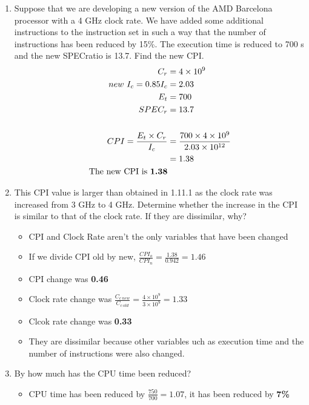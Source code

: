 \documentclass[10pt]{article}
\begin{document}
\begin{enumerate}
\begin{enumerate}
        \item
        Suppose that we are developing a new version of the AMD Barcelona processor with a 4 GHz clock rate. We have added some additional instructions to the instruction set in such a way that the number of instructions has been reduced by 15\%. The execution time is reduced to 700 s and the new SPECratio is 13.7. Find the new CPI.
        \begin{align*}
            C_r &= 4 \times 10^9\\
            new\ I_c = 0.85I_c &= 2.03\\
            E_t &= 700\\
            SPEC_r &= 13.7\\\\
            CPI = \frac{E_t \times C_r}{I_c} &= \frac{700 \times 4 \times 10^9}{2.03 \times 10^{12}}\\
            &= 1.38\\
            \text{The new CPI is \textbf{1.38}}
        \end{align*}
        \item
        This CPI value is larger than obtained in 1.11.1 as the clock rate was increased from 3 GHz to 4 GHz. Determine whether the increase in the CPI is similar to that of the clock rate. If they are dissimilar, why?
        \begin{itemize}
            \item CPI and Clock Rate aren't the only variables that have been changed
            \item If we divide CPI old by new, $\frac{CPI_o}{CPI_n} = \frac{1.38}{0.942} = 1.46$
            \item CPI change was \textbf{0.46}
            \item Clock rate change was $\frac{C_{c\ new}}{C_{c\ old}} = \frac{4 \times 10^9}{3 \times 10^9} = 1.33$
            \item Clcok rate change was \textbf{0.33}
            \item They are dissimilar because other variables uch as execution time and the number of instructions were also changed.
        \end{itemize}
        \item
        By how much has the CPU time been reduced?
        \begin{itemize}
            \item CPU time has been reduced by $\frac{750}{700} = 1.07$, it has been reduced by \textbf{7\%}
        \end{itemize}

\end{enumerate}
\end{enumerate}
\end{document}
